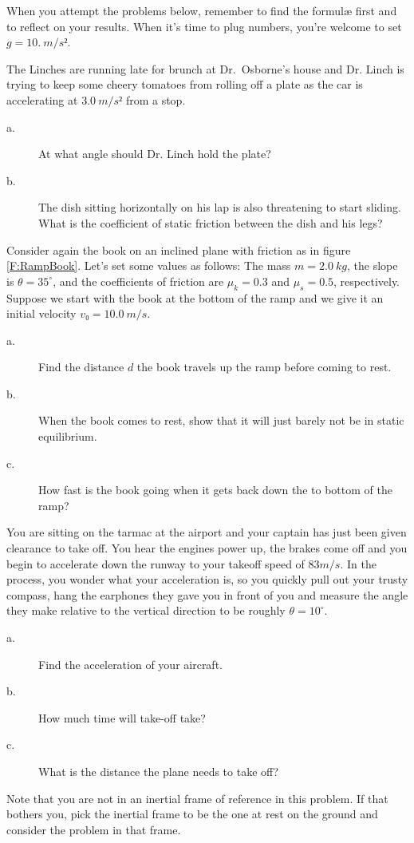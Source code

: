 When you attempt the problems below, remember to find the formul\ae{} first and to reflect on your results. When it's time to plug numbers, you're welcome to set $g=10.\ m/s²$.


\begin{exercise}
The Linches are running late for brunch at Dr.\ Osborne's house and Dr. Linch is trying to keep some cheery tomatoes from rolling off a plate as the car is accelerating at $3.0\ m/s²$ from a stop. 
\begin{description}
\item[a.] At what angle should Dr. Linch hold the plate?
\item[b.] The dish sitting horizontally on his lap is also threatening to start sliding. What is the coefficient of static friction between the dish and his legs?
\end{description}
\end{exercise}

\begin{exercise}
Consider again the book on an inclined plane with friction as in figure \ref{F:RampBook}. Let's set some values as follows: The mass $m=2.0\ kg$, the slope is $θ = 35^∘$, and the coefficients of friction are $μ_k = 0.3$ and $μ_s = 0.5$, respectively. 
Suppose we start with the book at the bottom of the ramp and we give it an initial velocity $v₀ = 10.0\ m/s$. 
\begin{description}
\item[a.] Find the distance $d$ the book travels up the ramp before coming to rest.
\item[b.] When the book comes to rest, show that it will just barely not be in static equilibrium.
\item[c.] How fast is the book going when it gets back down the to bottom of the ramp?
\end{description}
\end{exercise}


\begin{exercise}
You are sitting on the tarmac at the airport and your captain has just been given clearance to take off. You hear the engines power up, the brakes come off and you begin to accelerate down the runway to your takeoff speed of $83 m/s$. In the process, you wonder what your acceleration is, so you quickly pull out your trusty compass, hang the earphones they gave you in front of you and measure the angle they make relative to the vertical direction to be roughly $θ = 10^∘$. 
\begin{description}
\item[a.] Find the acceleration of your aircraft. 
\item[b.] How much time will take-off take?
\item[c.] What is the distance the plane needs to take off?
\end{description}
Note that you are not in an inertial frame of reference in this problem. If that bothers you, pick the inertial frame to be the one at rest on the ground and consider the problem in that frame.
\end{exercise}

